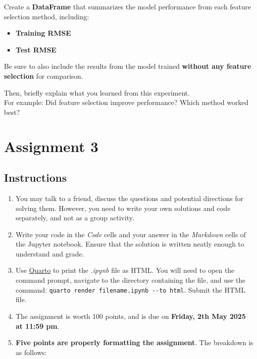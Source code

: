 \documentclass[
  letterpaper,
  DIV=11,
  numbers=noendperiod]{scrreprt}
\providecommand{\tightlist}{%
  \setlength{\itemsep}{0pt}\setlength{\parskip}{0pt}}\usepackage{longtable,booktabs,array}
\begin{document}
Create a \textbf{DataFrame} that summarizes the model performance from
each feature selection method, including:

\begin{itemize}
\tightlist
\item
  \textbf{Training RMSE}
\item
  \textbf{Test RMSE}
\end{itemize}

Be sure to also include the results from the model trained
\textbf{without any feature selection} for comparison.

Then, briefly explain what you learned from this experiment.\\
For example: Did feature selection improve performance? Which method
worked best?

\chapter{Assignment 3}\label{assignment-3}

\section*{Instructions}\label{instructions-2}


\begin{enumerate}
\def\labelenumi{\arabic{enumi}.}
\item
  You may talk to a friend, discuss the questions and potential
  directions for solving them. However, you need to write your own
  solutions and code separately, and not as a group activity.
\item
  Write your code in the \emph{Code} cells and your answer in the
  \emph{Markdown} cells of the Jupyter notebook. Ensure that the
  solution is written neatly enough to understand and grade.
\item
  Use
  \href{https://quarto.org/docs/output-formats/html-basics.html}{Quarto}
  to print the \emph{.ipynb} file as HTML. You will need to open the
  command prompt, navigate to the directory containing the file, and use
  the command: \texttt{quarto\ render\ filename.ipynb\ -\/-to\ html}.
  Submit the HTML file.
\item
  The assignment is worth 100 points, and is due on \textbf{Friday, 2th
  May 2025 at 11:59 pm}.
\item
  \textbf{Five points are properly formatting the assignment}. The
  breakdown is as follows:
\end{enumerate}
\end{document}
